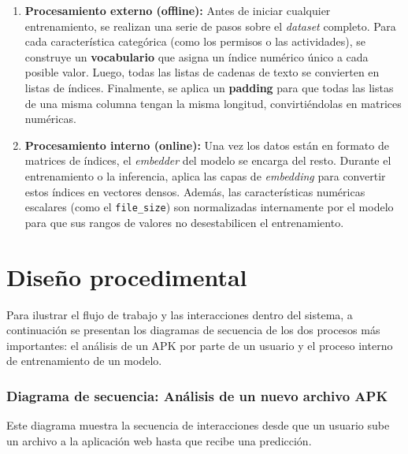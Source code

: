\begin{enumerate}
	\item \textbf{Procesamiento externo (offline):} Antes de iniciar cualquier entrenamiento, se realizan una serie de pasos sobre el \textit{dataset} completo. Para cada característica categórica (como los permisos o las actividades), se construye un \textbf{vocabulario} que asigna un índice numérico único a cada posible valor. Luego, todas las listas de cadenas de texto se convierten en listas de índices. Finalmente, se aplica un \textbf{padding} para que todas las listas de una misma columna tengan la misma longitud, convirtiéndolas en matrices numéricas.	
	
	\item \textbf{Procesamiento interno (online):} Una vez los datos están en formato de matrices de índices, el \textit{embedder} del modelo se encarga del resto. Durante el entrenamiento o la inferencia, aplica las capas de \textit{embedding} para convertir estos índices en vectores densos. Además, las características numéricas escalares (como el \texttt{file\_size}) son normalizadas internamente por el modelo para que sus rangos de valores no desestabilicen el entrenamiento.
\end{enumerate}

\section{Diseño procedimental}
Para ilustrar el flujo de trabajo y las interacciones dentro del sistema, a continuación se presentan los diagramas de secuencia de los dos procesos más importantes: el análisis de un APK por parte de un usuario y el proceso interno de entrenamiento de un modelo.

\subsubsection{Diagrama de secuencia: Análisis de un nuevo archivo APK}
Este diagrama muestra la secuencia de interacciones desde que un usuario sube un archivo a la aplicación web hasta que recibe una predicción.

%	

